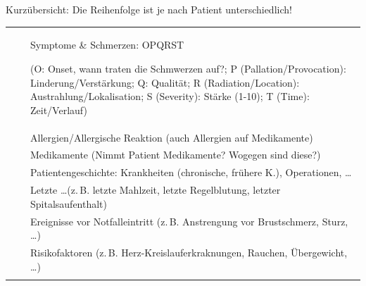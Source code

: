 \TableWide
{Kurzübersicht: }%
{Die Reihenfolge ist je nach Patient
unterschiedlich!}%
{\label{tab:checkliste-patientenmanagement}\label{tab:pam-weiterfuehrende}}%
{}%
{}%
{%
\begin{minipage}{\linewidth}
\FontTableBase
{\sffamily\FontTableBase\CorrectionItemizeBox\renewcommand{\itemhook}{%
  \setlength{\itemsep}{0.005\baselineskip}
  \setlength{\leftmargin}{1.4em}
  \setlength{\labelwidth}{0.9em}
}
\begin{tabulary}{\linewidth}[H]{lCL}
\toprule\addlinespace
{}
 &
{}
 &
Symptome {\&} Schmerzen: OPQRST

{\tiny(O: Onset, wann traten die Schmwerzen auf?; 
P (Pallation/Provocation): Linderung/Verstärkung; 
Q: Qualität; 
R (Radiation/Location): Austrahlung/Lokalisation; 
S (Severity): Stärke (1-10); 
T (Time): Zeit/Verlauf)}
\\\addlinespace
 &
{}
 &
Allergien/Allergische Reaktion (auch
Allergien auf Medikamente)
\\\addlinespace
 &
 {}
 &
Medikamente {\tiny(Nimmt Patient Medikamente?
Wogegen sind diese?)}
\\\addlinespace
 &
{}
 &
Patientengeschichte: Krankheiten {\tiny(chronische, frühere
K.)}, Operationen, \ldots 
\\\addlinespace
 &
 {}
 &
Letzte \ldots (z.\,B. letzte Mahlzeit, letzte
Regelblutung, letzter Spitalsaufenthalt)
\\\addlinespace
 &
 {}
 &
Ereignisse vor Notfalleintritt {\tiny(z.\,B.
Anstrengung vor Brustschmerz, Sturz, \ldots)}
\\\addlinespace
 &
 {}
 &
Risikofaktoren {\tiny(z.\,B.
Herz-Kreislauferkraknungen, Rauchen, Übergewicht, \ldots)}
\\\addlinespace\midrule\addlinespace


\end{tabulary}}
\end{minipage}}
